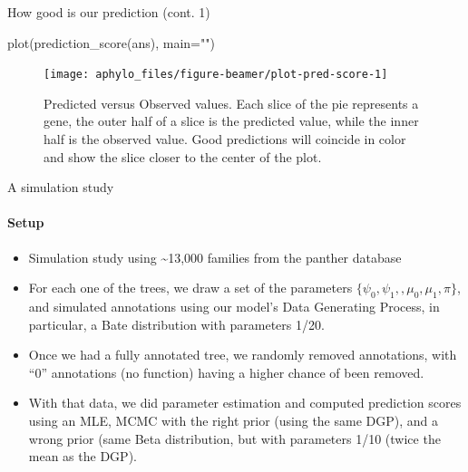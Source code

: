 \documentclass[9pt,ignorenonframetext,]{beamer}
\newenvironment{Shaded}{\begin{snugshade}}{\end{snugshade}}
\newcommand{\KeywordTok}[1]{\textcolor[rgb]{0.94,0.87,0.69}{#1}}
\newcommand{\DataTypeTok}[1]{\textcolor[rgb]{0.87,0.87,0.75}{#1}}
\newcommand{\StringTok}[1]{\textcolor[rgb]{0.80,0.58,0.58}{#1}}
\newcommand{\NormalTok}[1]{\textcolor[rgb]{0.80,0.80,0.80}{#1}}
\begin{document}
\begin{frame}[fragile,t]{How good is our prediction (cont. 1)}

\footnotesize

\begin{Shaded}
\begin{Highlighting}[]
\KeywordTok{plot}\NormalTok{(}\KeywordTok{prediction_score}\NormalTok{(ans), }\DataTypeTok{main=}\StringTok{""}\NormalTok{)}
\end{Highlighting}
\end{Shaded}

\begin{figure}

{\centering \texttt{[image: aphylo\_files/figure-beamer/plot-pred-score-1]} 

}

\caption{Predicted versus Observed values. Each slice of the pie represents a gene, the outer half of a slice is the predicted value, while the inner half is the observed value. Good predictions will coincide in color and show the slice closer to the center of the plot.}\label{fig:plot-pred-score}
\end{figure}

\normalsize

\end{frame}

\begin{frame}[t]{A simulation study}

\framesubtitle{Setup}

\begin{itemize}
\item
  Simulation study using \textasciitilde{}13,000 families from the
  panther database
\item
  For each one of the trees, we draw a set of the parameters
  \(\{\psi_0,\psi_1, ,\mu_0, \mu_1,\pi\}\), and simulated annotations
  using our model's Data Generating Process, in particular, a Bate
  distribution with parameters 1/20.
\item
  Once we had a fully annotated tree, we randomly removed annotations,
  with ``0'' annotations (no function) having a higher chance of been
  removed.
\item
  With that data, we did parameter estimation and computed prediction
  scores using an MLE, MCMC with the right prior (using the same DGP),
  and a wrong prior (same Beta distribution, but with parameters 1/10
  (twice the mean as the DGP).
\end{itemize}

\end{frame}
\end{document}
